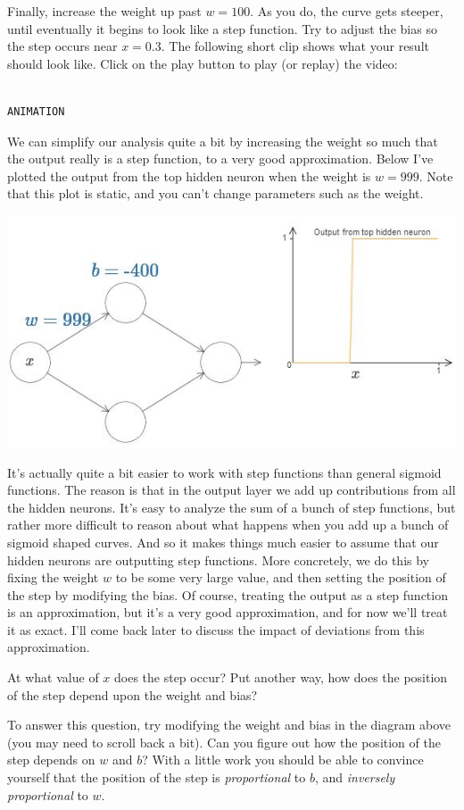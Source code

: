 \documentclass[a4paper,twoside,10pt]{book}
\begin{document}
Finally, increase the weight up past $w=100$. As you do, the curve gets steeper, until eventually it begins to look like a step function. Try to adjust the bias so the step occurs near $x=0.3$. The following short clip shows what your result should look like. Click on the play button to play (or replay) the video:
\begin{lstlisting}

ANIMATION
\end{lstlisting}
We can simplify our analysis quite a bit by increasing the weight so much that the output really is a step function, to a very good approximation. Below I've plotted the output from the top hidden neuron when the weight is $w=999$. Note that this plot is static, and you can't change parameters such as the weight.
\begin{center}
	\includegraphics[width=0.7\linewidth]{figures/ch4/high_weight_function}
\end{center}
It's actually quite a bit easier to work with step functions than general sigmoid functions. The reason is that in the output layer we add up contributions from all the hidden neurons. It's easy to analyze the sum of a bunch of step functions, but rather more difficult to reason about what happens when you add up a bunch of sigmoid shaped curves. And so it makes things much easier to assume that our hidden neurons are outputting step functions. More concretely, we do this by fixing the weight $w$ to be some very large value, and then setting the position of the step by modifying the bias. Of course, treating the output as a step function is an approximation, but it's a very good approximation, and for now we'll treat it as exact. I'll come back later to discuss the impact of deviations from this approximation.

At what value of $x$ does the step occur? Put another way, how does the position of the step depend upon the weight and bias?

To answer this question, try modifying the weight and bias in the diagram above (you may need to scroll back a bit). Can you figure out how the position of the step depends on $w$ and $b$? With a little work you should be able to convince yourself that the position of the step is \textit{proportional} to $b$, and \textit{inversely proportional} to $w$.
\end{document}

